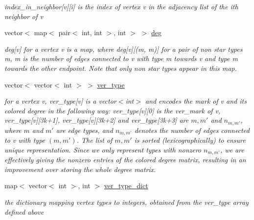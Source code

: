 \begin{DoxyCompactItemize}
\begin{DoxyCompactList}\small\item\em index\+\_\+in\+\_\+neighbor\mbox{[}v\mbox{]}\mbox{[}i\mbox{]} is the index of vertex v in the adjacency list of the ith neighbor of v \end{DoxyCompactList}\item 
vector$<$ map$<$ pair$<$ int, int $>$, int $>$ $>$ \hyperlink{classcolored__graph_ae3269d35c1b022bc70d195bebd4e1b8a}{deg}
\begin{DoxyCompactList}\small\item\em deg\mbox{[}v\mbox{]} for a vertex v is a map, where deg\mbox{[}v\mbox{]}\mbox{[}(m, m\textquotesingle{})\mbox{]} for a pair of non star types m, m\textquotesingle{} is the number of edges connected to v with type m towards v and type m\textquotesingle{} towards the other endpoint. Note that only non star types appear in this map. \end{DoxyCompactList}\item 
vector$<$ vector$<$ int $>$ $>$ \hyperlink{classcolored__graph_a2cc32e7146fa3319f83cfa940f5e1be4}{ver\+\_\+type}
\begin{DoxyCompactList}\small\item\em for a vertex v, ver\+\_\+type\mbox{[}v\mbox{]} is a vector$<$int$>$ and encodes the mark of v and its colored degree in the following way\+: ver\+\_\+type\mbox{[}v\mbox{]}\mbox{[}0\mbox{]} is the ver\+\_\+mark of v, ver\+\_\+type\mbox{[}v\mbox{]}\mbox{[}3k+1\mbox{]}, ver\+\_\+type\mbox{[}v\mbox{]}\mbox{[}3k+2\mbox{]} and ver\+\_\+type\mbox{[}3k+3\mbox{]} are $m, m'$ and $n_{m, m'}$, where $m$ and $m'$ are edge types, and $n_{m, m'}$ denotes the number of edges connected to v with type $(m, m')$. The list of $m, m'$ is sorted (lexicographically) to ensure unique representation. Since we only represent types with nonzero $n_{m, m'}$, we are effectively giving the nonzero entries of the colored degree matrix, resulting in an improvement over storing the whole degree matrix. \end{DoxyCompactList}\item 
map$<$ vector$<$ int $>$, int $>$ \hyperlink{classcolored__graph_aeb780762429ddac375799f4a45405712}{ver\+\_\+type\+\_\+dict}
\begin{DoxyCompactList}\small\item\em the dictionary mapping vertex types to integers, obtained from the ver\+\_\+type array defined above \end{DoxyCompactList}\item 

\end{DoxyCompactItemize}
